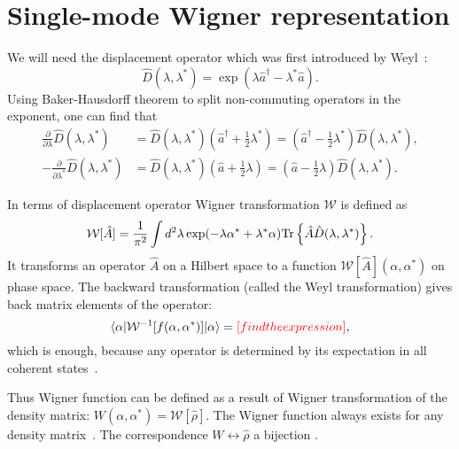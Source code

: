 \section{Single-mode Wigner representation}

We will need the displacement operator which was first introduced by Weyl~\cite{Weyl1950}:
\[
	\hat{D}(\lambda, \lambda^*) = \exp(\lambda \hat{a}^\dagger - \lambda^* \hat{a}).
\]
Using Baker-Hausdorff theorem to split non-commuting operators in the exponent,
one can find that
\begin{equation}
\label{eqn:formalism:sm-wigner:displacement-derivatives}
\begin{split}
	\frac{\partial}{\partial \lambda} \hat{D}(\lambda, \lambda^*)
	& = \hat{D}(\lambda, \lambda^*) (\hat{a}^\dagger + \frac{1}{2} \lambda^*)
	= (\hat{a}^\dagger - \frac{1}{2} \lambda^*) \hat{D}(\lambda, \lambda^*), \\
	-\frac{\partial}{\partial \lambda^*} \hat{D}(\lambda, \lambda^*)
	& = \hat{D}(\lambda, \lambda^*) (\hat{a} + \frac{1}{2} \lambda)
	= (\hat{a} - \frac{1}{2} \lambda) \hat{D}(\lambda, \lambda^*).
\end{split}
\end{equation}

In terms of displacement operator Wigner transformation $\mathcal{W}$ is defined as
\begin{equation}
\label{eqn:formalism:sm-wigner:w-transformation}
	\mathcal{W}[\hat{A}]
	= \frac{1}{\pi^2} \int d^2 \lambda \exp(-\lambda \alpha^* + \lambda^* \alpha)
		\mathrm{Tr} \left\{  \hat{A} \hat{D}(\lambda, \lambda^*)  \right\}.
\end{equation}
It transforms an operator $\hat{A}$ on a Hilbert space to a function $\mathcal{W}[\hat{A}](\alpha, \alpha^*)$ on phase space.
The backward transformation (called the Weyl transformation) gives back matrix elements of the operator:
\[
	\langle \alpha \lvert \mathcal{W}^{-1}[f(\alpha, \alpha^*)] \rvert \alpha \rangle
	= \textcolor{red}{[find the expression]},
\]
which is enough, because any operator is determined by its expectation in all coherent states~\cite{Gardiner2004}.

Thus Wigner function can be defined as a result of Wigner transformation of the density matrix: $W(\alpha, \alpha^*) = \mathcal{W}[\hat{\rho}]$.
The Wigner function always exists for any density matrix~\cite{Gardiner2004}.
The correspondence $W \leftrightarrow \hat{\rho}$ a bijection .

